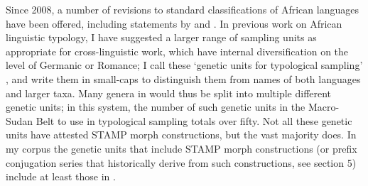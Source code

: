 \documentclass[output=paper]{langsci/langscibook}
\begin{document}
Since 2008, a number of revisions to standard classifications of African languages have been offered, including statements by \cite{Dimmendaal2008, Dimmendaal2011} and \citet{Sands2009}. In previous work on African linguistic typology, I have suggested a larger range of sampling units as appropriate for cross-linguistic work, which have internal diversification on the level of Germanic or Romance; I call these `genetic units for typological sampling' \citep{Anderson2011}, and write them in small-caps to distinguish them from names of both languages and larger taxa. Many genera in  would thus be split into multiple different genetic units; in this system, the number of such genetic units in the Macro-Sudan Belt to use in typological sampling totals over fifty. Not all these genetic units have attested STAMP morph constructions, but the vast majority does. In my corpus the genetic units that include STAMP morph constructions (or prefix conjugation series that historically derive from such constructions, see section 5) include at least those in .
\end{document}

